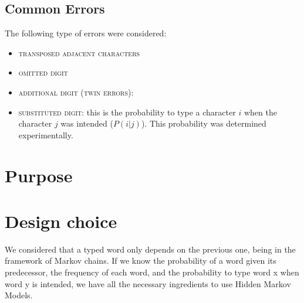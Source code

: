 \subsection{Common Errors}
The following type of errors were considered:
\begin{itemize}
	\item \textsc{transposed adjacent characters}
	\item \textsc{omitted digit}
	\item \textsc{additional digit (twin errors)}:
	\item \textsc{substituted digit}: this is the probability to type a
	character $i$ when the character $j$ was intended ($P(i|j)$). This 
	probability was determined experimentally. %
\end{itemize}


\section{Purpose}

\section{Design choice}
We considered that a typed word only depends on the previous one, being 
in the framework of Markov chains. If we know the probability of a word 
given its predecessor, the frequency of each word, and the probability to 
type word x when word y is intended, we have all the necessary ingredients 
to use Hidden Markov Models.


